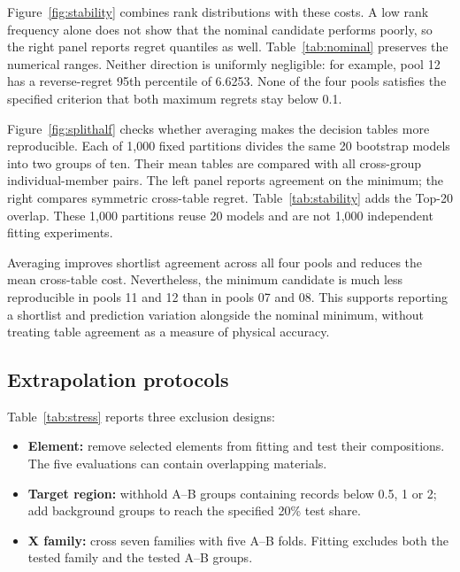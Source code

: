 Figure~\ref{fig:stability} combines rank distributions with these costs. A low rank frequency alone does not show that the nominal candidate performs poorly, so the right panel reports regret quantiles as well. Table~\ref{tab:nominal} preserves the numerical ranges. Neither direction is uniformly negligible: for example, pool 12 has a reverse-regret 95th percentile of 6.6253. None of the four pools satisfies the specified criterion that both maximum regrets stay below 0.1.

\FloatBarrier

Figure~\ref{fig:splithalf} checks whether averaging makes the decision tables more reproducible. Each of 1,000 fixed partitions divides the same 20 bootstrap models into two groups of ten. Their mean tables are compared with all cross-group individual-member pairs. The left panel reports agreement on the minimum; the right compares symmetric cross-table regret. Table~\ref{tab:stability} adds the Top-20 overlap. These 1,000 partitions reuse 20 models and are not 1,000 independent fitting experiments.

Averaging improves shortlist agreement across all four pools and reduces the mean cross-table cost. Nevertheless, the minimum candidate is much less reproducible in pools 11 and 12 than in pools 07 and 08. This supports reporting a shortlist and prediction variation alongside the nominal minimum, without treating table agreement as a measure of physical accuracy.
\FloatBarrier

\subsection{Extrapolation protocols}
Table~\ref{tab:stress} reports three exclusion designs:
\begin{itemize}
  \item \textbf{Element:} remove selected elements from fitting and test their compositions. The five evaluations can contain overlapping materials.
  \item \textbf{Target region:} withhold A--B groups containing records below 0.5, 1 or 2; add background groups to reach the specified 20\% test share.
  \item \textbf{X family:} cross seven families with five A--B folds. Fitting excludes both the tested family and the tested A--B groups.
\end{itemize}


